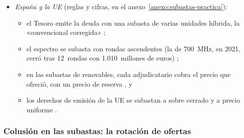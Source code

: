 \documentclass[11pt]{article}
\begin{document}
\begin{itemize}
\begin{itemize}
  \end{itemize}
\item \emph{España y la UE} (reglas y cifras, en el anexo~\ref{anexo:subastas-practica}):
  \begin{itemize}
  \item el Tesoro emite la deuda con una subasta de varias unidades híbrida, la «convencional corregida» ;
  \item el espectro se subasta con rondas ascendentes (la de 700~MHz, en 2021, cerró tras 12~rondas con 1.010~millones de euros\nocite{MINECO2021Subasta700}) ;
  \item en las subastas de renovables, cada adjudicatario cobra el precio que ofreció, con un precio de reserva , y
  \item los derechos de emisión de la UE se subastan a sobre cerrado y a precio uniforme .
  \end{itemize}
\end{itemize}

\subsubsection{Colusión en las subastas: la rotación de ofertas}\label{sec:colusion-subastas}
\end{document}
